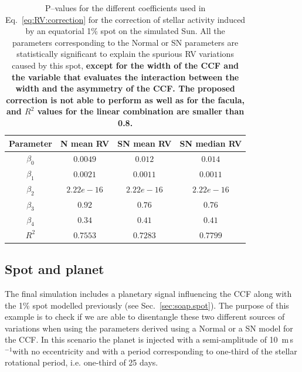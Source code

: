 \documentclass{aa}
\def\ms{\hbox{\,m\,s$^{-1}$}}         %
\begin{document}
\begin{table}
\begin{center}
\caption{P--values for the different coefficients used in Eq.~\eqref{eq:RV:correction} for the correction of stellar activity induced by an equatorial 1\% spot on the simulated Sun. All the parameters corresponding to the Normal or SN parameters are statistically significant to explain the spurious RV variations caused by this spot, {\bf{except for the width of the CCF and the variable that evaluates the interaction between the width and the asymmetry of the CCF. The proposed correction is not able to perform as well as for the facula, and $R^2$ values for the linear combination are smaller than 0.8.}}
} 
\label{table:spot.test}
\begin{tabular}{|c|c|c|c|}
\hline
Parameter          & N mean RV         &   SN mean RV &   SN median RV \\
\hline
$\beta_{0}$            &    $0.0049$    & $0.012$ & $0.014$ \\
\hline
$\beta_{1}$            &    $0.0021$    & $0.0011$ & $0.0011$ \\
\hline
$\beta_{2}$            &     $2.22e-16$   &  $2.22e-16$ & $2.22e-16$\\
\hline
$\beta_{3}$            &     $0.92$   &  $0.76$ & $0.76$\\
\hline
$\beta_{4}$            &     $0.34$   &  $0.41$ & $0.41$\\
\hline
$R^{2}$      &     $0.7553$    &  $0.7283$ & $0.7799$  \\
\hline
\end{tabular}
\end{center}
\end{table}











\subsection{Spot and planet} \label{sec:soap.spot.planet}

The final simulation includes a planetary signal influencing the CCF along with the 1\% spot modelled previously (see Sec.~\ref{sec:soap.spot}). 
The purpose of this example is to check if we are able to disentangle these two different sources of variations when using the parameters derived using a Normal or a SN model for the CCF. In this scenario the planet is injected with a semi-amplitude of 10 \ms with no eccentricity and with a period corresponding to one-third of the stellar rotational period, i.e. one-third of 25 days.
\end{document}
